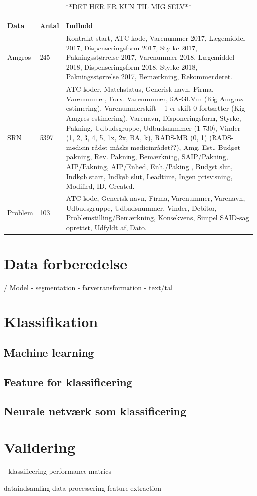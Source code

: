 \vspace{2mm}
\begin{longtable}{p{2.5cm}|p{1cm}|p{11cm}}
	\caption{**DET HER ER KUN TIL MIG SELV**}
	\vspace{2mm}
	\label{table:XXX} \\
\cellcolor[HTML]{C0C0C0} {\textbf{Data}} & {\cellcolor[HTML]{C0C0C0}\textbf{Antal}} & 
{\cellcolor[HTML]{C0C0C0}\textbf{Indhold}} \\ \hline
Amgros & 245 & Kontrakt start, ATC-kode, Varenummer 2017, Lægemiddel 2017, Dispenseringsform 2017, Styrke 2017, Pakningsstørrelse 2017, Varenummer 2018, Lægemiddel 2018, Dispenseringsform 2018, Styrke 2018, Pakningsstørrelse 2017, Bemærkning, Rekommenderet.\\ \hline
SRN & 5397 & ATC-koder, Matchstatus, Generisk navn, Firma, Varenummer, Forv. Varenummer, SA-Gl.Vnr (Kig Amgros estimering), Varenummerskift – 1 er skift 0 fortsætter (Kig Amgros estimering), Varenavn, Disponeringsform, Styrke, Pakning, Udbudsgruppe, Udbudsnummer (1-730), Vinder (1, 2, 3, 4, 5, 1x, 2x, BA, k), RADS-MR (0, 1) (RADS- medicin rådet måske medicinrådet??), Amg. Est., Budget pakning, Rev. Pakning, Bemærkning, SAIP/Pakning, AIP/Pakning,
AIP/Enhed, Enh./Paking , Budget slut, Indkøb start, Indkøb slut, Leadtime, Ingen prisvisning, Modified, ID, Created.\\ \hline
Problem & 103 & ATC-kode, Generisk navn, Firma, Varenummer, Varenavn, Udbudsgruppe, Udbudsnummer, Vinder, Debitor, Problemstilling/Bemærkning, Konsekvens, Simpel SAID-sag oprettet, Udfyldt af, Dato. \\ \hline
\end{longtable}







\section{Data forberedelse} / Model
- segmentation
- farvetransformation - text/tal

\section{Klassifikation}
\subsection{Machine learning}
\subsection{Feature for klassificering}
\subsection{Neurale netværk som klassificering}

\section{Validering}
- klassificering performance matrics 


dataindsamling
data processering 
feature extraction 